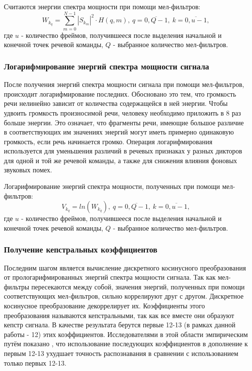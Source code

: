 Считаются энергии спектра мощности при помощи мел-фильтров:
\begin{equation}
	W_{k_q} = \sum_{m=0}^{N-1} |S_{k_m}|^2 \cdot H(q,m),~q=\overline{0,Q-1},~k=\overline{0,u-1},
\end{equation}
где $u$ - количество фреймов, получившееся после выделения начальной и конечной точек речевой команды, $Q$ - выбранное количество мел-фильтров.

\subsubsection{Логарифмирование энергий спектра мощности сигнала}
После получения энергий спектра мощности сигнала при помощи мел-фильтров, происходит логарифмирование последних. Обосновано это тем, что громкость речи нелинейно зависит от количества содержащейся в ней энергии. Чтобы удвоить громкость произносимой речи, человеку необходимо приложить в 8 раз больше энергии. Это означает, что фрагменты речи, имеющие большое различие в соответствующих им значениях энергий могут иметь примерно одинаковую громкость, если речь начинается громко. Операция логарифмирования используется
для уменьшения различий в речевых признаках у разных дикторов для одной и той же речевой команды, а также для снижения влияния фоновых звуковых помех.

Логарифмирование энергий спектра мощности, полученных при помощи мел-фильтров:
\begin{equation}
	V_{k_q} = ln(W_{k_q}),~q=\overline{0,Q-1},~k=\overline{0,u-1},
\end{equation}
где $u$ - количество фреймов, получившееся после выделения начальной и конечной точек речевой команды, $Q$ - выбранное количество мел-фильтров.

\subsubsection{Получение кепстральных коэффициентов}
Последним шагом является вычисление дискретного косинусного преобразования от прологарифмированных энергий спектра мощности сигнала. Так как мел-фильтры пересекаются между собой, значения энергий, полученных при помощи соответствующих мел-фильтров, сильно коррелируют друг с другом. Дискретное косинусное преобразование декоррелирует их. Коэффициенты этого преобразования называются кепстральными, так как все вместе они образуют кепстр сигнала. В качестве результата берутся первые 12-13 (в рамках данной работы - 12) этих коэффициентов. Исследователями в этой области эмпирическим путём показано \cite{MFCC}, что использование последующих коэффициентов в дополнение к первым 12-13 ухудшает точность распознавания в сравнении с использованием только первых 12-13.

